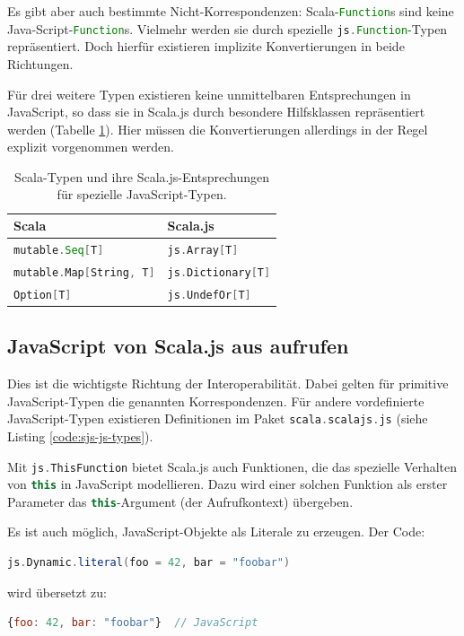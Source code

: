 \documentclass[a4paper, 12pt, hidelinks, listof=totoc, listoftables=totoc, bibliography=totoc]{scrreprt}
\newcommand{\scala}[1]{\lstinline[language=Scala, style=inline]|#1|}
\newcommand{\js}[1]{\lstinline[language=JavaScript, style=inline]|#1|}
\begin{document}
Es gibt aber auch bestimmte Nicht-Korrespondenzen: Scala-\scala{Function}s sind keine Java-Script-\js{Function}s. Vielmehr werden sie durch spezielle \scala{js.Function}-Typen repräsentiert. Doch hierfür existieren implizite Konvertierungen in beide Richtungen.

Für drei weitere Typen existieren keine unmittelbaren Entsprechungen in JavaScript, so dass sie in Scala.js durch besondere Hilfsklassen repräsentiert werden (Tabelle \ref{table:type-non-correspondance}). Hier müssen die Konvertierungen allerdings in der Regel explizit vorgenommen werden.

\begin{table}[!h]
\begin{tabular}{|l|l|}
\hline \textbf{Scala}                 & \textbf{Scala.js} \\ 
\hline \scala{mutable.Seq[T]}         & \scala{js.Array[T]} \\ 
\hline \scala{mutable.Map[String, T]} & \scala{js.Dictionary[T]} \\ 
\hline \scala{Option[T]}              & \scala{js.UndefOr[T]} \\ 
\hline 
\end{tabular}
\caption[Scala-Typen und ihre Scala.js-Entsprechungen für spezielle JavaScript-Typen.]{Scala-Typen und ihre Scala.js-Entsprechungen für spezielle JavaScript-Typen. \cite{scalajs.DJI}}
\label{table:type-non-correspondance}
\end{table}



\subsection{JavaScript von Scala.js aus aufrufen}

Dies ist die wichtigste Richtung der Interoperabilität. Dabei gelten für primitive JavaScript-Typen die genannten Korrespondenzen. Für andere vordefinierte JavaScript-Typen existieren Definitionen im Paket \scala{scala.scalajs.js} (siehe Listing \ref{code:sjs-js-types}).

Mit \scala{js.ThisFunction} bietet Scala.js auch Funktionen, die das spezielle Verhalten von \js{this} in JavaScript modellieren. Dazu wird einer solchen Funktion als erster Parameter das \js{this}-Argument (der Aufrufkontext) übergeben.

Es ist auch möglich, JavaScript-Objekte als Literale zu erzeugen. Der Code:
\begin{lstlisting}[language=Scala, style=snippet]
js.Dynamic.literal(foo = 42, bar = "foobar")
\end{lstlisting}
wird übersetzt zu:
\begin{lstlisting}[language=JavaScript, style=snippet]
{foo: 42, bar: "foobar"}  // JavaScript
\end{lstlisting}
\end{document}
